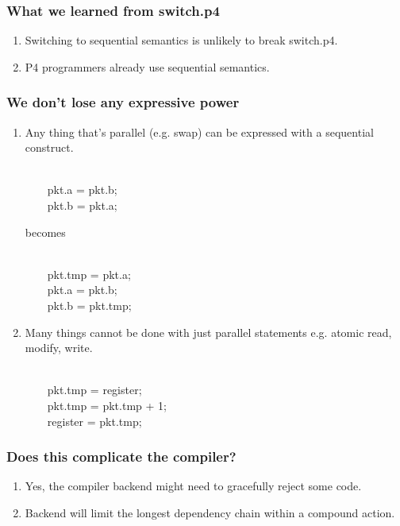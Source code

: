 \documentclass[aspectratio=169]{beamer}
\begin{document}
\begin{frame}[fragile]
  \frametitle{What we learned from switch.p4}
  \begin{enumerate}
    \item<1-> Switching to sequential semantics is unlikely to break switch.p4.
    \item<2-> P4 programmers already use sequential semantics.
  \end{enumerate}
\end{frame}

\begin{frame}[fragile]
  \frametitle{We don't lose any expressive power}
  \begin{enumerate}
  \item<1-> Any thing that's parallel (e.g. swap) can be expressed with a sequential construct.
    \begin{texttt} \\
    \ \ \ \   pkt.a = pkt.b; \\
    \ \ \ \   pkt.b = pkt.a; \\
    \end{texttt}
    becomes
    \begin{texttt} \\
    \ \ \ \   pkt.tmp = pkt.a; \\
    \ \ \ \   pkt.a = pkt.b; \\
    \ \ \ \   pkt.b = pkt.tmp; \\
    \end{texttt}
  \item<2-> Many things cannot be done with just parallel statements e.g. atomic read, modify, write.
    \begin{texttt} \\
    \ \ \ \   pkt.tmp = register; \\
    \ \ \ \   pkt.tmp = pkt.tmp  + 1; \\
    \ \ \ \   register = pkt.tmp; \\
    \end{texttt}
  \end{enumerate}
\end{frame}

\begin{frame}[fragile]
  \frametitle{Does this complicate the compiler?}
  \begin{enumerate}
    \item<1-> Yes, the compiler backend might need to gracefully reject some code.
    \item<2-> Backend will limit the longest dependency chain within a compound action.
  \end{enumerate}
\end{frame}
\end{document}
